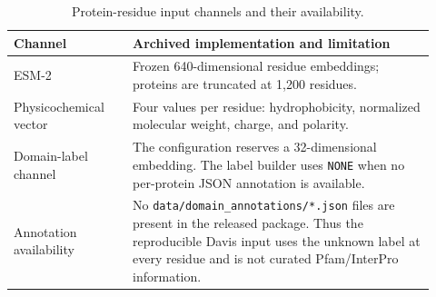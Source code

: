 \documentclass[11pt]{article}
\begin{document}
\begin{table}[H]
\centering
\caption{Protein-residue input channels and their availability.}
\begin{tabular}{p{0.26\linewidth}p{0.66\linewidth}}
\toprule
Channel & Archived implementation and limitation \\
\midrule
ESM-2 & Frozen 640-dimensional residue embeddings; proteins are truncated at 1,200 residues. \\
Physicochemical vector & Four values per residue: hydrophobicity, normalized molecular weight, charge, and polarity. \\
Domain-label channel & The configuration reserves a 32-dimensional embedding. The label builder uses \texttt{NONE} when no per-protein JSON annotation is available. \\
Annotation availability & No \texttt{data/domain\_annotations/*.json} files are present in the released package. Thus the reproducible Davis input uses the unknown label at every residue and is not curated Pfam/InterPro information. \\
\bottomrule
\end{tabular}
\end{table}
\end{document}
